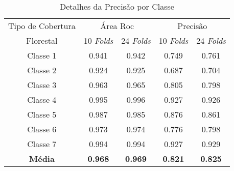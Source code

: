 \begin{table}[!h]
\caption{ Detalhes da Precisão por Classe }
\label{tb:resuroc}
\centering
\setlength{\tabcolsep}{5pt}
\begin{tabular}{ccccc}
\hline
Tipo de Cobertura &\multicolumn{2}{c}{Área Roc} &\multicolumn{2}{c}{Precisão}   \\
Florestal &10 \textit{Folds} &24 \textit{Folds} &10 \textit{Folds} &24 \textit{Folds} \\
\hline
Classe 1 &0.941 &0.942 &0.749 &0.761 \\
Classe 2 &0.924 &0.925 &0.687 &0.704 \\
Classe 3 &0.963 &0.965 &0.805 &0.798 \\
Classe 4 &0.995 &0.996 &0.927 &0.926 \\
Classe 5 &0.987 &0.985 &0.876 &0.861 \\
Classe 6 &0.973 &0.974 &0.776 &0.798 \\
Classe 7 &0.994 &0.994 &0.927 &0.929 \\
\hline
\textbf{Média} &\textbf{0.968} &\textbf{0.969} &\textbf{0.821} &\textbf{0.825} \\
\hline
\end{tabular}
\\
\singlespacing
{}
\end{table}

